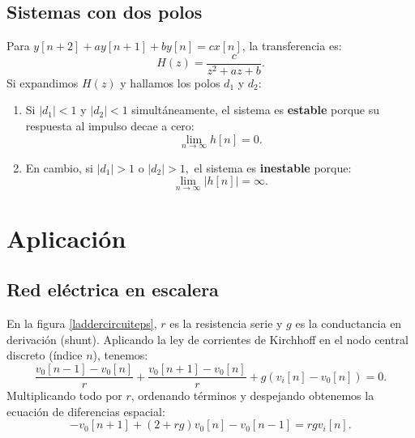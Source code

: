 \subsection{Sistemas con dos polos}
Para $y[n+2] + a y[n+1] + b y[n] = c x[n]$, la transferencia es:
\begin{equation}
	H(z) = \frac{c}{z^2 + a z + b}.
\end{equation}
Si expandimos $H(z)$ y hallamos los polos $d_1$ y $d_2$:
\begin{enumerate}
	\item Si $|d_1| < 1$ y $|d_2| < 1$ simultáneamente, el sistema es \textbf{estable} porque su respuesta al impulso decae a cero:
	\begin{equation}
		\lim_{n \to \infty} h[n] = 0.
	\end{equation}
	
	\item En cambio, si $|d_1| > 1$ o $|d_2| > 1,$ el sistema es \textbf{inestable} porque:
	\begin{equation}
		\lim_{n \to \infty} |h[n]| = \infty.
	\end{equation}
\end{enumerate}

\section{Aplicaci\'{o}n}

\subsection{Red el\'{e}ctrica en escalera}

En la figura \ref{laddercircuiteps}, $r$ es la resistencia serie y $g$ es la conductancia en derivación (shunt). Aplicando la ley de corrientes de Kirchhoff en el nodo central discreto (índice $n$), tenemos:
\begin{equation}
	\frac{v_0[n-1] - v_0[n]}{r} + \frac{v_0[n+1] - v_0[n]}{r} + g(v_i[n] - v_0[n]) = 0.
\end{equation}
Multiplicando todo por $r$, ordenando términos y despejando obtenemos la ecuación de diferencias espacial:
\begin{equation}
	-v_0[n+1] + (2+rg) v_0[n] - v_0[n-1] = rg v_i[n]. \label{sisCuatro}
\end{equation}

